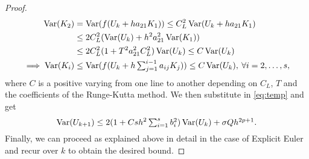 \begin{proof}
\begin{equation}
\begin{aligned}
		\operatorname{Var}(K_2) &= \operatorname{Var}(f(U_k + ha_{21}K_1)) \leq C_L^2 \operatorname{Var}(U_k + ha_{21}K_1) \\
		&\leq 2C_L^2 (\operatorname{Var}(U_k) + h^2a_{21}^2\operatorname{Var}(K_1)) \\
		&\leq 2C_L^2 (1 + T^2a_{21}^2C_L^2)\operatorname{Var}(U_k) \leq C \operatorname{Var}(U_k) \\
		\implies \operatorname{Var}(K_i) &\leq \operatorname{Var}(f(U_k + h \textstyle\sum_{j=1}^{i-1}a_{ij}K_j)) \leq C \operatorname{Var}(U_k), \: \forall i = 2, \ldots, s,
	\end{aligned}
\end{equation}
where $C$ is a positive varying from one line to another depending on $C_L$, $T$ and the coefficients of the Runge-Kutta method. We then substitute in \eqref{eq:temp} and get
\begin{equation}
	\operatorname{Var}(U_{k+1}) \leq 2 (1 + Csh^2\textstyle\sum_{i=1}^{s}b_i^2) \operatorname{Var}(U_k) + \sigma Q h^{2p + 1}. \\
\end{equation}
Finally, we can proceed as explained above in detail in the case of Explicit Euler and recur over $k$ to obtain the desired bound. 
\end{proof}

